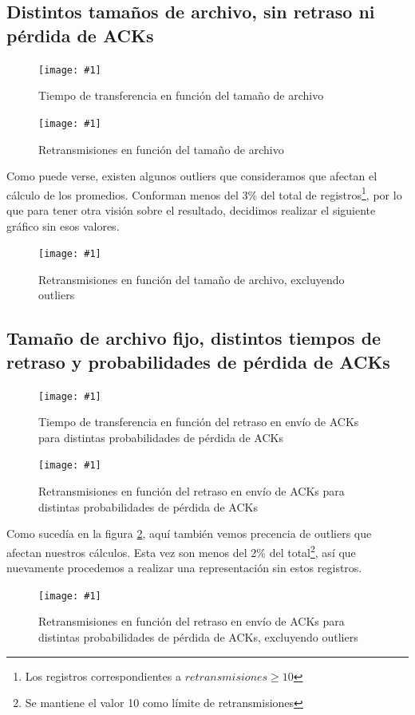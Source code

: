 \documentclass[a4paper, 10pt, twoside]{article}
\newcommand{\grafico}[3]{
  \begin{figure}[H]
    \texttt{[image: \#1]}
    \caption{#2}
    \label{#3}
  \end{figure}
}
\begin{document}
\subsection{Distintos tamaños de archivo, sin retraso ni pérdida de ACKs}

\grafico{time_vs_size}
        {Tiempo de transferencia en función del tamaño de archivo}
        {plot:time_vs_size}

\grafico{retransmissions_vs_size}
        {Retransmisiones en función del tamaño de archivo}
        {plot:retransmissions_vs_size}

Como puede verse, existen algunos outliers que consideramos que afectan el cálculo de los promedios. Conforman menos del 3\% del total de registros\footnote{Los registros correspondientes a $retransmisiones \ge 10$}, por lo que para tener otra visión sobre el resultado, decidimos realizar el siguiente gráfico sin esos valores.

\grafico{retransmissions_vs_size_wo_outliers}
        {Retransmisiones en función del tamaño de archivo, excluyendo outliers}
        {plot:retransmissions_vs_size_wo_outliers}


\subsection{Tamaño de archivo fijo, distintos tiempos de retraso y probabilidades de pérdida de ACKs}

\grafico{time_vs_delay_and_loss_probability}
        {Tiempo de transferencia en función del retraso en envío de ACKs para distintas probabilidades de pérdida de ACKs}
        {plot:time_vs_delay_and_loss_probability}

\grafico{retransmissions_vs_delay_and_loss_probability}
        {Retransmisiones en función del retraso en envío de ACKs para distintas probabilidades de pérdida de ACKs}
        {plot:retransmissions_vs_delay_and_loss_probability}

Como sucedía en la figura \ref{plot:retransmissions_vs_size}, aquí también vemos precencia de outliers que afectan nuestros cálculos. Esta vez son menos del 2\% del total\footnote{Se mantiene el valor 10 como límite de retransmisiones}, así que nuevamente procedemos a realizar una representación sin estos registros.

\grafico{retransmissions_vs_delay_and_loss_probability_wo_outliers}
        {Retransmisiones en función del retraso en envío de ACKs para distintas probabilidades de pérdida de ACKs, excluyendo outliers}
        {plot:retransmissions_vs_delay_and_loss_probability_wo_outliers}
\end{document}
